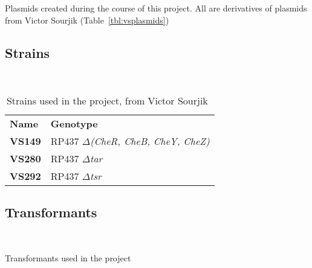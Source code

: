 \documentclass[../main.tex]{subfiles}
\begin{document}
\begin{table}[h!]
\begin{center}
\caption[Plasmids]{Plasmids created during the course of this project. All are derivatives of plasmids from Victor Sourjik (Table~\ref{tbl:vsplasmids})}
\label{tbl:myplasmids}
\end{center}
\end{table}
\newpage
\subsection{Strains}
~
\begin{table}[h!]
\begin{center}
\begin{tabular}{ll}
\textbf{Name}	&	\textbf{Genotype}	\\
\textbf{VS149}	&	RP437 \textit{$\Delta$(CheR, CheB, CheY, CheZ)}	\\
\textbf{VS280}	&	RP437 \textit{$\Delta$tar}	\\
\textbf{VS292}	&	RP437 \textit{$\Delta$tsr}	
\end{tabular}
\caption[Strains]{Strains used in the project, from Victor Sourjik~\citep{sourjik00, kentner09}}
\end{center}
\end{table}

\subsection{Transformants}
~
\begin{table}[h!]
\begin{center}
\caption[Transformants]{Transformants used in the project}
\label{tbl:klstrains}
\end{center}
\end{table}
\end{document}
